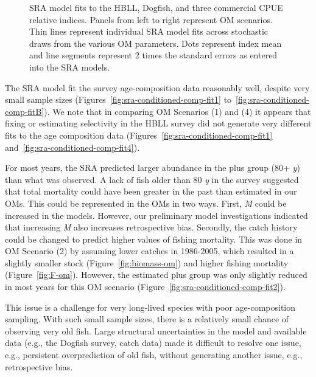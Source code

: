 \documentclass[11pt]{book}
\begin{document}
\begin{figure}[htb]

{\centering {} 

}

\caption{SRA model fits to the HBLL, Dogfish, and three commercial CPUE relative indices. Panels from left to right represent OM scenarios. Thin lines represent individual SRA model fits across stochastic draws from the various OM parameters. Dots represent index mean and line segments represent 2 times the standard errors as entered into the SRA models.}\label{fig:survey-fits}
\end{figure}
The SRA model fit the survey age-composition data reasonably well, despite very small sample sizes (Figures~\ref{fig:sra-conditioned-comp-fit1} to~\ref{fig:sra-conditioned-comp-fitB}). We note that in comparing OM Scenarios (1) and (4) it appears that fixing or estimating selectivity in the HBLL survey did not generate very different fits to the age composition data (Figures~\ref{fig:sra-conditioned-comp-fit1} and~\ref{fig:sra-conditioned-comp-fit4}).

For most years, the SRA predicted larger abundance in the plus group (80+ \emph{y}) than what was observed. A lack of fish older than 80 \emph{y} in the survey suggested that total mortality could have been greater in the past than estimated in our OMs. This could be represented in the OMs in two ways. First, \emph{M} could be increased in the models. However, our preliminary model investigations indicated that increasing \emph{M} also increases retrospective bias. Secondly, the catch history could be changed to predict higher values of fishing mortality. This was done in OM Scenario (2) by assuming lower catches in 1986-2005, which resulted in a slightly smaller stock (Figure~\ref{fig:biomass-om}) and higher fishing mortality (Figure~\ref{fig:F-om}). However, the estimated plus group was only slightly reduced in most years for this OM scenario (Figure~\ref{fig:sra-conditioned-comp-fit2}).

This issue is a challenge for very long-lived species with poor age-composition sampling. With such small sample sizes, there is a relatively small chance of observing very old fish. Large structural uncertainties in the model and available data (e.g., the Dogfish survey, catch data) made it difficult to resolve one issue, e.g., persistent overprediction of old fish, without generating another issue, e.g., retrospective bias.
\end{document}
